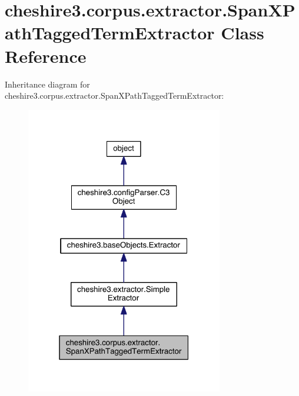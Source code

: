 \hypertarget{classcheshire3_1_1corpus_1_1extractor_1_1_span_x_path_tagged_term_extractor}{\section{cheshire3.\-corpus.\-extractor.\-Span\-X\-Path\-Tagged\-Term\-Extractor Class Reference}
\label{classcheshire3_1_1corpus_1_1extractor_1_1_span_x_path_tagged_term_extractor}
}


Inheritance diagram for cheshire3.\-corpus.\-extractor.\-Span\-X\-Path\-Tagged\-Term\-Extractor\-:
\nopagebreak
\begin{figure}[H]
\begin{center}
\leavevmode
\includegraphics[width=244pt]{classcheshire3_1_1corpus_1_1extractor_1_1_span_x_path_tagged_term_extractor__inherit__graph}
\end{center}
\end{figure}


